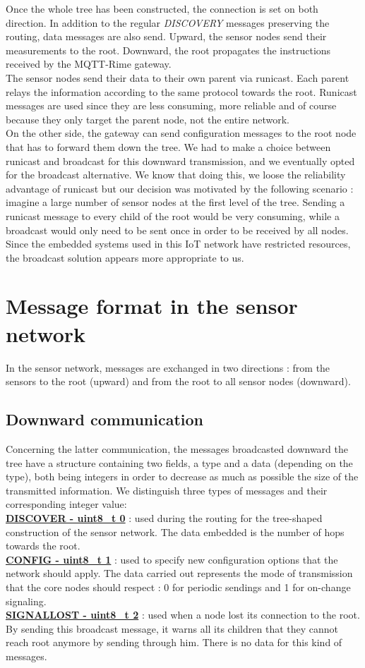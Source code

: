 \documentclass{article}
\begin{document}
Once the whole tree has been constructed, the connection is set on both direction. In addition to the regular \textit{DISCOVERY} messages preserving the routing, data messages are also send. Upward, the sensor nodes send their measurements to the root. Downward, the root propagates the instructions received by the MQTT-Rime gateway.\\
The sensor nodes send their data to their own parent via runicast. Each parent relays the information according to the same protocol towards the root. Runicast messages are used since they are less consuming, more reliable and of course because they only target the parent node, not the entire network.
\\
On the other side, the gateway can send configuration messages to the root node that has to forward them down the tree. We had to make a choice between runicast and broadcast for this downward transmission, and we eventually opted for the broadcast alternative. We know that doing this, we loose the reliability advantage of runicast but our decision was motivated by the following scenario : imagine a large number of sensor nodes at the first level of the tree. Sending a runicast message to every child of the root would be very consuming, while a broadcast would only need to be sent once in order to be received by all nodes. Since the embedded systems used in this IoT network have restricted resources, the broadcast solution appears more appropriate to us.


\section{Message format in the sensor network}

In the sensor network, messages are exchanged in two directions : from the sensors to the root (upward) and from the root to all sensor nodes (downward).
\subsection{Downward communication}
Concerning the latter communication, the messages broadcasted downward the tree have a structure containing two fields, a type and a data (depending on the type), both being integers in order to decrease as much as possible the size of the transmitted information. We distinguish three types of messages and their corresponding integer value: \\
\underline{\textbf{DISCOVER - uint8\_t 0}} : used during the routing for the tree-shaped construction of the sensor network. The data embedded is the number of hops towards the root. \\
\underline{\textbf{CONFIG - uint8\_t 1}} : used to specify new configuration options that the network should apply. The data carried out represents the mode of transmission that the core nodes should respect : 0 for periodic sendings and 1 for on-change signaling.\\
\underline{\textbf{SIGNALLOST - uint8\_t 2}} : used when a node lost its connection to the root. By sending this broadcast message, it warns all its children that they cannot reach root anymore by sending through him. There is no data for this kind of messages.
\end{document}
